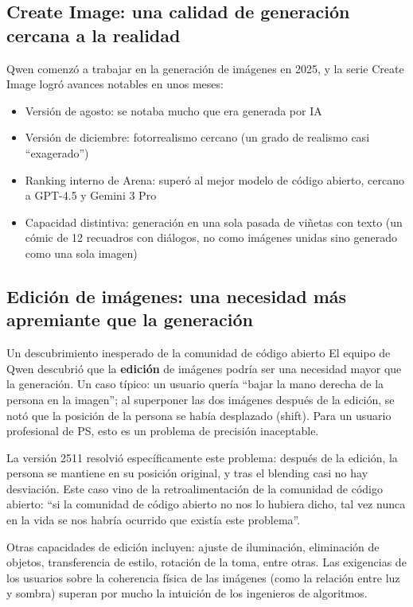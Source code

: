 \documentclass[a4paper]{article}
\begin{document}
\subsection{Create Image: una calidad de generación cercana a la realidad}

Qwen comenzó a trabajar en la generación de imágenes en 2025, y la serie Create Image logró avances notables en unos meses:

\begin{itemize}
    \item Versión de agosto: se notaba mucho que era generada por IA
    \item Versión de diciembre: fotorrealismo cercano (un grado de realismo casi ``exagerado'')
    \item Ranking interno de Arena: superó al mejor modelo de código abierto, cercano a GPT-4.5 y Gemini 3 Pro
    \item Capacidad distintiva: generación en una sola pasada de viñetas con texto (un cómic de 12 recuadros con diálogos, no como imágenes unidas sino generado como una sola imagen)
\end{itemize}

\subsection{Edición de imágenes: una necesidad más apremiante que la generación}

\begin{importantbox}{Un descubrimiento inesperado de la comunidad de código abierto}
El equipo de Qwen descubrió que la \textbf{edición} de imágenes podría ser una necesidad mayor que la generación. Un caso típico: un usuario quería ``bajar la mano derecha de la persona en la imagen''; al superponer las dos imágenes después de la edición, se notó que la posición de la persona se había desplazado (shift). Para un usuario profesional de PS, esto es un problema de precisión inaceptable.

La versión 2511 resolvió específicamente este problema: después de la edición, la persona se mantiene en su posición original, y tras el blending casi no hay desviación. Este caso vino de la retroalimentación de la comunidad de código abierto: ``si la comunidad de código abierto no nos lo hubiera dicho, tal vez nunca en la vida se nos habría ocurrido que existía este problema''.
\end{importantbox}

Otras capacidades de edición incluyen: ajuste de iluminación, eliminación de objetos, transferencia de estilo, rotación de la toma, entre otras. Las exigencias de los usuarios sobre la coherencia física de las imágenes (como la relación entre luz y sombra) superan por mucho la intuición de los ingenieros de algoritmos.
\end{document}
